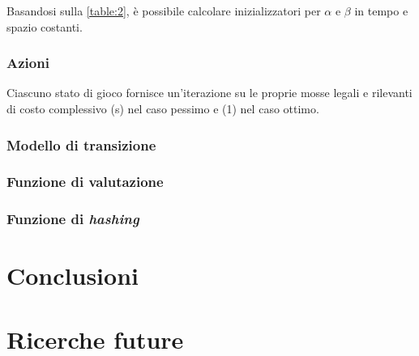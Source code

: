 \documentclass{article}
\begin{document}
Basandosi sulla \ref{table:2}, è possibile calcolare inizializzatori per
$\alpha$ e $\beta$ in tempo e spazio costanti.

\subsubsection{Azioni} \label{pattern-search}

Ciascuno stato di gioco fornisce un'iterazione su le proprie mosse legali e
rilevanti di costo complessivo \varTheta(s) nel caso pessimo e \varTheta(1) nel
caso ottimo.

\subsubsection{Modello di transizione}

\subsubsection{Funzione di valutazione}

\subsubsection{Funzione di \emph{hashing}}

\section{Conclusioni}

\section{Ricerche future}

\pagebreak

\begin{sloppypar}
\printbibliography[
  heading=bibintoc
]
\end{sloppypar}
\end{document}
